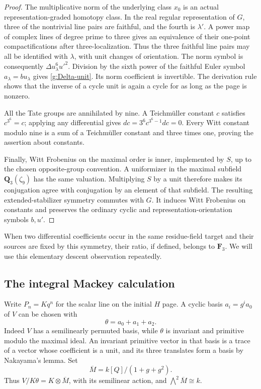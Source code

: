 \documentclass[11pt]{article}
\theoremstyle{definition}
\theoremstyle{remark}
\numberwithin{equation}{section}
\begin{document}
\begin{proof}
The multiplicative norm of the underlying class $x_0$ is an actual
representation-graded homotopy class.  In the real regular
representation of $G$, three of the nontrivial line pairs are
faithful, and the fourth is $\lambda'$.  A power map of complex lines
of degree prime to three gives an equivalence of their one-point
compactifications after three-localization.  Thus the three faithful
line pairs may all be identified with $\lambda$, with unit changes
of orientation.  The norm symbol is consequently
$\Delta u_\lambda^6u'^2$.  Division by the sixth power of the
faithful Euler symbol $a_\lambda=bu_\lambda$ gives
\eqref{g:Delta-unit}.  Its norm coefficient is invertible.  The
derivation rule shows that the inverse of a cycle unit is again a
cycle for as long as the page is nonzero.

All the Tate groups are annihilated by nine.  A Teichm\"uller
constant $c$ satisfies $c^{3^6}=c$; applying any differential gives
$dc=3^6c^{3^6-1}dc=0$.  Every Witt constant modulo nine is a sum of
a Teichm\"uller constant and three times one, proving the assertion
about constants.

Finally, Witt Frobenius on the maximal order is inner, implemented
by $S$, up to the chosen opposite-group convention.  A uniformizer
in the maximal subfield $\mathbf Q_3(\zeta_9)$ has the same valuation.
Multiplying $S$ by a unit therefore makes its conjugation agree
with conjugation by an element of that subfield.  The resulting
extended-stabilizer symmetry commutes with $G$.  It induces Witt
Frobenius on constants and preserves the ordinary cyclic and
representation-orientation symbols $b,u'$.
\end{proof}

When two differential coefficients occur in the same residue-field
target and their sources are fixed by this symmetry, their ratio,
if defined, belongs to $\mathbf F_3$.  We will use this elementary descent
observation repeatedly.

\subsection{The integral Mackey calculation}

Write $P_n=Kq^n$ for the scalar line on the initial $H$ page.  A
cyclic basis $a_i=g^ia_0$ of $V$ can be chosen with
\[
 \theta=a_0+a_1+a_2.
\]
Indeed $V$ has a semilinearly permuted basis, while $\theta$ is
invariant and primitive modulo the maximal ideal.  An invariant
primitive vector in that basis is a trace of a vector whose
coefficient is a unit, and its three translates form a basis by
Nakayama's lemma.  Set
\[
 \overline M=k[Q]/(1+g+g^2).
\]
Thus $V/K\theta=K\otimes\overline M$, with its semilinear action,
and $\bigwedge^2\overline M\cong k$.
\end{document}

